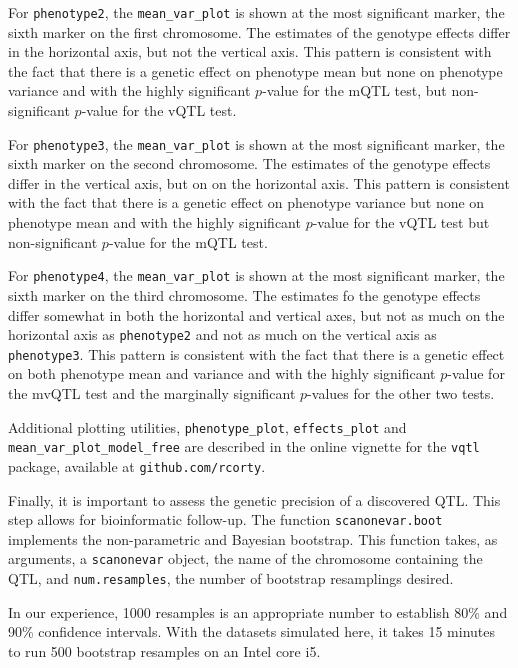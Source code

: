 \documentclass{article}
\begin{document}
For \texttt{phenotype2}, the \texttt{mean\_var\_plot} is shown at the most significant marker, the sixth marker on the first chromosome.
The estimates of the genotype effects differ in the horizontal axis, but not the vertical axis.
This pattern is consistent with the fact that there is a genetic effect on phenotype mean but none on phenotype variance and with the highly significant $p$-value for the mQTL test, but non-significant $p$-value for the vQTL test.

For \texttt{phenotype3}, the \texttt{mean\_var\_plot} is shown at the most significant marker, the sixth marker on the second chromosome.
The estimates of the genotype effects differ in the vertical axis, but on on the horizontal axis.
This pattern is consistent with the fact that there is a genetic effect on phenotype variance but none on phenotype mean and with the highly significant $p$-value for the vQTL test but non-significant $p$-value for the mQTL test.

For \texttt{phenotype4}, the \texttt{mean\_var\_plot} is shown at the most significant marker, the sixth marker on the third chromosome.
The estimates fo the genotype effects differ somewhat in both the horizontal and vertical axes, but not as much on the horizontal axis as \texttt{phenotype2} and not as much on the vertical axis as \texttt{phenotype3}.
This pattern is consistent with the fact that there is a genetic effect on both phenotype mean and variance and with the highly significant $p$-value for the mvQTL test and the marginally significant $p$-values for the other two tests.

Additional plotting utilities, \texttt{phenotype\_plot}, \texttt{effects\_plot} and \texttt{mean\_var\_plot\_model\_free} are described in the online vignette for the \texttt{vqtl} package, available at \texttt{github.com/rcorty}.


Finally, it is important to assess the genetic precision of a discovered QTL.
This step allows for bioinformatic follow-up.
The function \texttt{scanonevar.boot} implements the non-parametric and Bayesian bootstrap.
This function takes, as arguments, a \texttt{scanonevar} object, the name of the chromosome containing the QTL, and \texttt{num.resamples}, the number of bootstrap resamplings desired.

In our experience, 1000 resamples is an appropriate number to establish 80\% and 90\% confidence intervals.
With the datasets simulated here, it takes 15 minutes to run 500 bootstrap resamples on an Intel core i5.
\end{document}
